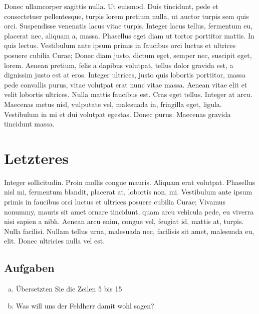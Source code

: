 \documentclass[a4paper,10pt,noonelinecaption,normalheadings]{scrartcl}
\begin{document}
\begin{multicols}{2}
\begin{linenumbers}
Donec ullamcorper sagittis nulla. Ut euismod. Duis tincidunt, pede et consectetuer pellentesque, turpis lorem pretium nulla, ut auctor turpis sem quis orci. Suspendisse venenatis lacus vitae turpis. Integer lacus tellus, fermentum eu, placerat nec, aliquam a, massa. Phasellus eget diam ut tortor porttitor mattis. In quis lectus. Vestibulum ante ipsum primis in faucibus orci luctus et ultrices posuere cubilia Curae; Donec diam justo, dictum eget, semper nec, suscipit eget, lorem. Aenean pretium, felis a dapibus volutpat, tellus dolor gravida est, a dignissim justo est at eros. Integer ultrices, justo quis lobortis porttitor, massa pede convallis purus, vitae volutpat erat nunc vitae massa. Aenean vitae elit et velit lobortis ultrices. Nulla mattis faucibus est. Cras eget tellus. Integer at arcu. Maecenas metus nisl, vulputate vel, malesuada in, fringilla eget, ligula. Vestibulum in mi et dui volutpat egestas. Donec purus. Maecenas gravida tincidunt massa.

\section{Letzteres}

Integer sollicitudin. Proin mollis congue mauris. Aliquam erat volutpat. Phasellus nisl mi, fermentum blandit, placerat at, lobortis non, mi. Vestibulum ante ipsum primis in faucibus orci luctus et ultrices posuere cubilia Curae; Vivamus nonummy, mauris sit amet ornare tincidunt, quam arcu vehicula pede, eu viverra nisi sapien a nibh. Aenean arcu enim, congue vel, feugiat id, mattis at, turpis. Nulla facilisi. Nullam tellus urna, malesuada nec, facilisis sit amet, malesuada eu, elit. Donec ultricies nulla vel est.
\end{linenumbers}
\end{multicols}

\subsection*{Aufgaben}
\begin{enumerate}[a)]
\item Übersetzten Sie die Zeilen 5 bis 15
\item Was will uns der Feldherr damit wohl sagen?
\end{enumerate}
\end{document}
